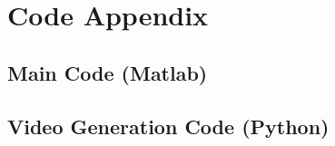 \renewcommand\thesection{\Alph{section}}
\setcounter{section}{0}
\section{Code Appendix}

% 

\subsection{Main Code (Matlab)}

\clearpage


\subsection{Video Generation Code (Python)}

\clearpage


